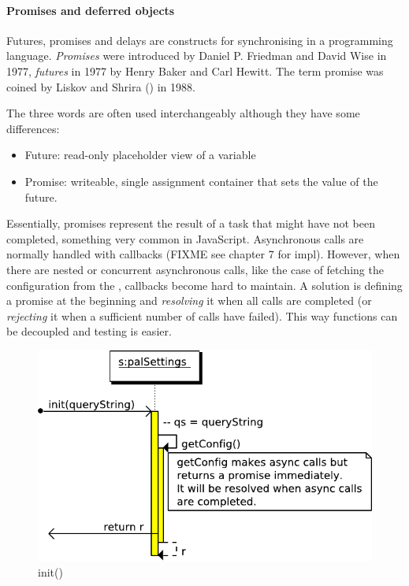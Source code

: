 \paragraph{Promises and deferred objects} Futures, promises and delays are constructs for synchronising in a programming language.
\textit{Promises} were introduced by Daniel P. Friedman and David Wise in 1977, \textit{futures} in 1977 by Henry Baker and Carl Hewitt.
The term promise was coined by Liskov and Shrira (\cite{Liskov:1988}) in 1988.

The three words are often used interchangeably although they have some differences:
\begin{itemize}
\item Future: read-only placeholder view of a variable
\item Promise: writeable, single assignment container that sets the value of the future.
\end{itemize}
Essentially, promises represent the result of a task that might have not been completed, something very common in JavaScript.
Asynchronous calls are normally handled with callbacks (FIXME see chapter 7 for impl).
However, when there are nested or concurrent asynchronous calls, like the case of fetching the configuration from the \flangobe , callbacks become hard to maintain.
A solution is defining a promise at the beginning and \emph{resolving} it when all calls are completed (or \emph{rejecting} it when a sufficient number of calls have failed).
This way functions can be decoupled and testing is easier. 

\begin{figure}[htb]
    \centering
    \includegraphics{figures/design/seqdia/palSettings-init.pdf}
    \caption{init()}
    \label{fig:design-seqdia-palSettings-init}
\end{figure}

